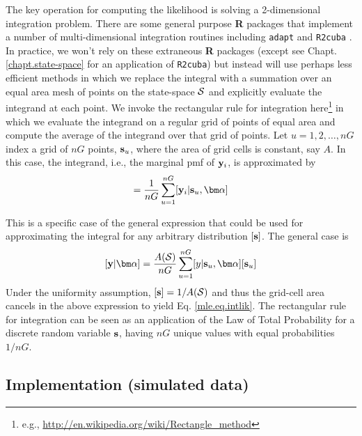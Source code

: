 The key operation for computing the likelihood is solving a
2-dimensional integration problem. There are some general purpose {\bf
  R} packages that implement a number of 
 multi-dimensional integration routines
including \mbox{\tt adapt} \citep{genz_etal:2007} and \mbox{\tt R2cuba}
\citep{hahn_etal:2011}.  In practice, we won't rely
on these extraneous {\bf R} packages (except see
Chapt. \ref{chapt.state-space} for an application of \mbox{\tt R2cuba})
but instead will use perhaps less
efficient methods in which we replace the integral with a summation
over an equal area mesh of points on the state-space ${\cal S}$ and explicitly
evaluate the integrand at each point. We invoke the rectangular rule
for integration here\footnote{e.g., 
\url{http://en.wikipedia.org/wiki/Rectangle_method}
} in which we
evaluate the
integrand on a regular grid of points of equal area and compute the
average of
the integrand over that grid of points. 
Let $u=1,2,\ldots,nG$ index a grid of
$nG$ points, ${\bf s}_{u}$,  where the area of grid cells is
constant, say $A$.
In this case, the integrand, i.e., the marginal pmf of 
${\bf y}_{i}$, is approximated by  
\begin{equation}
         [{\bf y}_{i}|{\bm \alpha}] = \frac{1}{nG} \sum_{u=1}^{nG}  [ {\bf
            y}_{i} |{\bf s}_u, {\bm \alpha}]
\label{mle.eq.intlik}
\end{equation}

This is a specific case of the general expression that could be used
for approximating the integral for any arbitrary 
distribution $[{\bf s}]$. The general case is
\[
[{\bf y}|{\bm \alpha}]  = \frac{A({\cal S})}{nG} \sum_{u=1}^{nG} [y|{\bf s}_{u},{\bm \alpha}] [{\bf s}_{u}]
\]
Under the uniformity assumption,
 $[{\bf s}] = 1/A({\cal S})$
and thus the grid-cell area cancels in the above
expression to yield Eq. \ref{mle.eq.intlik}.
The rectangular rule for integration can be seen as an application of
the Law of Total Probability for a discrete random variable ${\bf
  s}$, having $nG$ 
unique values with equal probabilities $1/nG$.


\subsection{Implementation (simulated data)}

